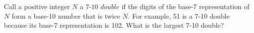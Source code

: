 Call a positive integer $N$ a $\textit{7-10 double}$ if the digits of the base-7 representation of $N$ form a base-10 number that is twice $N.$  For example, 51 is a 7-10 double because its base-7 representation is 102.  What is the largest 7-10 double?